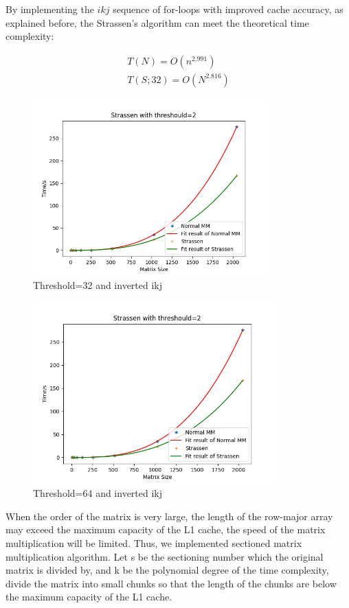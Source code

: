 \documentclass[UTF8]{ctexart}
\begin{document}
By implementing the \(ikj\) sequence of for-loops with improved cache
accuracy, as explained before, the Strassen's algorithm can meet the
theoretical time complexity:

\begin{equation}
  \begin{aligned}
    T(N)=O(n^{2.991}) \\
    T(S;32)=O(N^{2.816})
  \end{aligned}
\end{equation}

\begin{figure}[htb]
  \centering
  \includegraphics[height=6.8cm]{../ppt/slide-UIBK/th=32_ijk.png}
  \caption{Threshold=32 and inverted ikj}
\end{figure}

\begin{figure}[htb]
  \centering
  \includegraphics[height=7.0cm]{../ppt/slide-UIBK/th=64_ijk.png}
  \caption{Threshold=64 and inverted ikj}
\end{figure}

When the order of the matrix is very large, the length of the row-major
array may exceed the maximum capacity of the L1 cache, the speed of the
matrix multiplication will be limited. Thus, we implemented sectioned
matrix multiplication algorithm. Let s be the sectioning number which
the original matrix is divided by, and k be the polynomial degree of the
time complexity, divide the matrix into small chunks so that the length
of the chunks are below the maximum capacity of the L1 cache.
\end{document}
